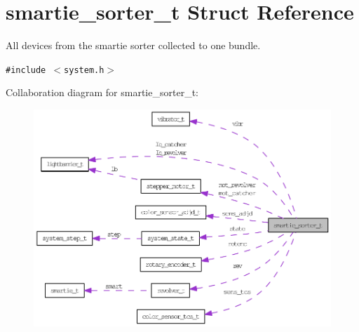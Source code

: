 \hypertarget{structsmartie__sorter__t}{
\section{smartie\_\-sorter\_\-t Struct Reference}
\label{structsmartie__sorter__t}
}
All devices from the smartie sorter collected to one bundle.  


{\tt \#include $<$system.h$>$}

Collaboration diagram for smartie\_\-sorter\_\-t:\nopagebreak
\begin{figure}[H]
\begin{center}
\leavevmode
\includegraphics[width=400pt]{structsmartie__sorter__t__coll__graph}
\end{center}
\end{figure}
